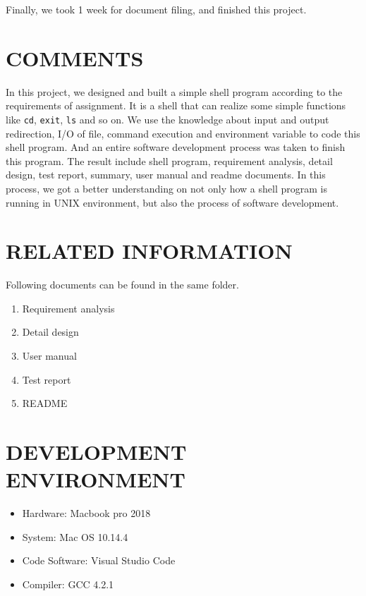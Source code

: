 \documentclass{article}
\begin{document}
Finally, we took 1 week for document filing, and finished this project.

\section{COMMENTS}

In this project, we designed and built a simple shell program according to the requirements of assignment.
It is a shell that can realize some simple functions like \verb|cd|, \verb|exit|, \verb|ls| and so on.
We use the knowledge about input and output redirection, I/O of file, command execution and environment variable to code this shell program. And an entire software development process was taken to finish this program. The result include  shell program, requirement analysis, detail design, test report, summary, user manual and readme documents.
In this process, we got a better understanding on not only how a shell program is running in UNIX environment, but also the process of software development.

\newpage
\section{RELATED INFORMATION}

Following documents can be found in the same folder.

\begin{enumerate}
\item Requirement analysis
\item Detail design
\item User manual
\item Test report
\item README
\end{enumerate}

\section{DEVELOPMENT ENVIRONMENT}

\begin{itemize}
\item Hardware: Macbook pro 2018
\item System: Mac OS 10.14.4
\item Code Software: Visual Studio Code
\item Compiler: GCC 4.2.1
\end{itemize}
\end{document}
